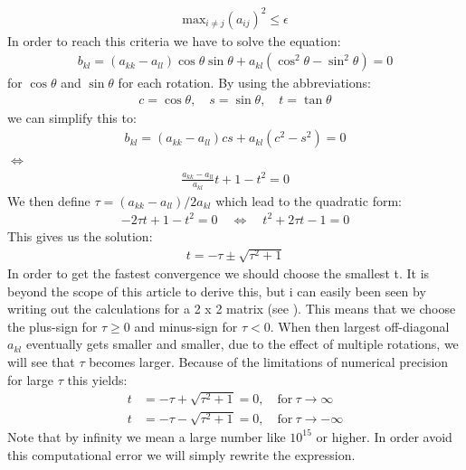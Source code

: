 \documentclass[american,a4paper,12pt]{article}
\begin{document}
\begin{align*}
    \text{max}_{i \ne j}(a_{ij})^2 \le \epsilon
\end{align*}
In order to reach this criteria we have to solve the equation:
\begin{align*}
    b_{kl} = (a_{kk} - a_{ll})\cos{\theta}\sin{\theta} + a_{kl}(\cos^2{\theta} - \sin^2{\theta})= 0
\end{align*}
for $\cos{\theta}$ and $\sin{\theta}$ for each rotation. By using the abbreviations:
\begin{align*}
    c = \cos{\theta}, \quad s = \sin{\theta}, \quad t = \tan{\theta}
\end{align*}
we can simplify this to:
\begin{align*}
    b_{kl} = (a_{kk} - a_{ll})cs + a_{kl}(c^2 - s^2)= 0
\end{align*}
$\Longleftrightarrow$
\begin{align*}
    \frac{a_{kk} - a_{ll}}{a_{kl}}t + 1 - t^2 = 0
\end{align*}
We then define $\tau = (a_{kk} - a_{ll})/2a_{kl}$ which lead to the quadratic form:
\begin{align*}
    -2\tau t + 1 - t^2 = 0 \quad \Longleftrightarrow \quad t^2 + 2\tau t - 1 = 0
\end{align*}
This gives us the solution:
\begin{align*}
    t = -\tau \pm \sqrt{\tau^2 + 1}
\end{align*}
In order to get the fastest convergence we should choose the smallest t. It is beyond the scope of this article to derive this, but i can easily been seen by writing out the calculations for a  2 x 2 matrix (see \cite{lecnotes7}). This means that we choose the plus-sign for $\tau \ge 0$ and minus-sign for $\tau < 0$. When then largest off-diagonal $a_{kl}$ eventually gets smaller and smaller, due to the effect of multiple rotations, we will see that $\tau$ becomes larger. Because of the limitations of numerical precision for large $\tau$ this yields:
\begin{align*}
    t &= -\tau + \sqrt{\tau^2 + 1} = 0, \quad \text{for} \ \tau \rightarrow \infty \\ 
    t &= -\tau - \sqrt{\tau^2 + 1} = 0, \quad \text{for} \ \tau \rightarrow -\infty
\end{align*}
Note that by infinity we mean a large number like $10^{15}$ or higher. In order avoid this computational error we will simply
rewrite the expression. \\ \\
\end{document}
